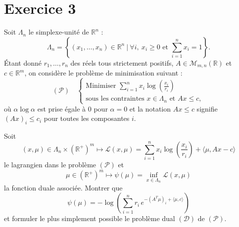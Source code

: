 \documentclass[11pt, a4paper]{article}
\begin{document}
\section*{Exercice 3}
%
Soit $\Lambda_n$ le simplexe-unité de $\mathbb{R}^n$ :
\[
\Lambda_n = \left\{ (x_1,\ldots,x_n)\in\mathbb{R}^n\ |\ \forall i,\ x_i\geq 0
\mbox{ et } \sum_{i=1}^n x_i = 1 \right\}.
\]
%
\'Etant donné $r_1,\ldots,r_n$ des réels tous strictement positifs, 
$A\in\mathcal{M}_{m,n}(\mathbb{R})$ et $c\in \mathbb{R}^m$, on considère le
problème de minimisation suivant :
\[
(\mathcal{P})\quad \left\{\begin{array}{l}
\mbox{Minimiser } \displaystyle{\sum_{i=1}^n x_i \log \left(\frac{x_i}{r_i}\right)} \\ [1.1ex]
\mbox{sous les contraintes } x\in\Lambda_n \mbox{ et } Ax\leq c,
\end{array}\right.
\]
où $\alpha\log \alpha$ est prise égale à 0 pour $\alpha=0$ et la notation
$Ax\leq c$ signifie $(Ax)_i\leq c_i$ pour toutes les composantes $i$. 

Soit 
\[
(x,\mu)\in\Lambda_n\times (\mathbb{R}^+)^m \mapsto
\mathcal{L}(x,\mu) = \sum_{i=1}^n x_i \log\left(\frac{x_i}{r_i}\right)
+ \langle \mu,Ax-c \rangle
\]
le lagrangien dans le problème $(\mathcal{P})$ et
\[
\mu \in \left( \mathbb{R}^+ \right)^m \mapsto
\psi(\mu) = \inf_{x\in \Lambda_n} \mathcal{L}(x,\mu)
\]
la fonction duale associée. Montrer que
%
\[
\psi(\mu) = -\log\left( \sum_{i=1}^n r_i\, e^{-(A^T\mu)_i + \langle\mu,c\rangle  } \right)
\]
et formuler le plus simplement possible le problème dual $(\mathcal{D})$ de $(\mathcal{P})$.
%
\end{document}
